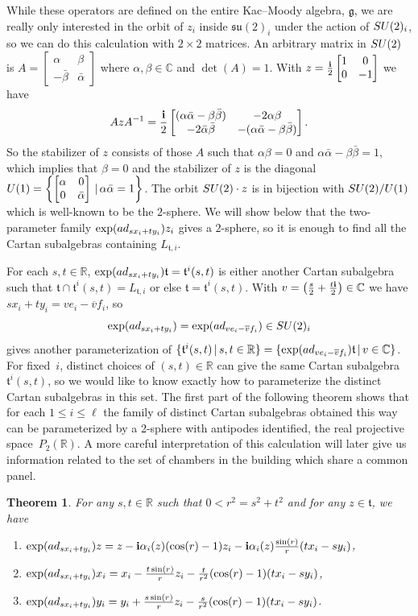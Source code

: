 \documentclass[11pt]{article}
\numberwithin{equation}{section}
\numberwithin{equation}{section}
\newtheorem{Theorem}{Theorem}[section]
\def\C{{\mathbb C}}
\def\R{\mathbb{R}}
\def\a{\alpha}
\def\bet{\beta}
\def\bm{\begin{bmatrix}}
\def\ebm{\end{bmatrix}}
\def\bi{{\bf i}}
\def\fg{\mathfrak{g}}
\def\ft{\mathfrak{t}}
\def\fsu{\mathfrak{su}}
\begin{document}
While these operators are defined on the entire Kac--Moody algebra, $\fg$, we are really only interested in the orbit of $z_i$ inside $\fsu(2)_i$ under the action of ${\rm SU}(2)_i$, so we can do this calculation with $2\times 2$ matrices. An arbitrary matrix in ${\rm SU}(2)$ is
$A = \bm \a&\bet\\ -\bar\bet&\bar\a\ebm$ where $\a,\bet\in\C$ and $\det(A) = 1$. With $z = \frac{\bi}{2} \bm 1&0\\0&-1\ebm$ we have
\[AzA^{-1} = \frac{\bi}{2} \bm (\a\bar\a-\bet\bar\bet)&-2\a\bet \\-2\bar\a\bar\bet&-(\a\bar\a-\bet\bar\bet)\ebm.\]
So the stabilizer of $z$ consists of those $A$ such that $\a\bet = 0$ and $\a\bar\a-\bet\bar\bet = 1$, which implies that $\bet = 0$ and
the stabilizer of $z$ is the diagonal ${\rm U}(1) = \left\{\bm \a&0\\ 0&\bar\a\ebm \,|\, \a\bar\a = 1\right\}$. The orbit ${\rm SU}(2)\cdot z$ is in
bijection with ${\rm SU}(2)/{\rm U}(1)$ which is well-known to be the $2$-sphere. We will show below that the two-parameter family
$\exp({\rm ad}_{sx_i+ty_i})z_i$ gives a $2$-sphere, so it is enough to find all the Cartan subalgebras containing $L_{\ft,i}$.

For each $s,t\in\R$, $\exp({\rm ad}_{sx_i+ty_i})\ft = \ft^i(s,t)$ is either another Cartan subalgebra such that $\ft\cap\ft^i(s,t) = L_{\ft,i}$ or else
$\ft = \ft^i(s,t)$. With $v=\big(\frac{s}{2}+\frac{t\bi}{2}\big)\in\C$ we have $sx_i+ty_i = v e_i-\overline{v}f_i$, so
\[\exp({\rm ad}_{sx_i+ty_i}) = \exp({\rm ad}_{v e_i-\overline{v}f_i}) \in {\rm SU}(2)_i\]
gives another parameterization of $\{\ft^i(s,t)\, |\, s,t\in\R\} = \{ \exp({\rm ad}_{v e_i-\overline{v}f_i})\ft\, |\, v\in\C\}$. For fixed~$i$, distinct choices of $(s,t)\in\R$ can give the same Cartan subalgebra $\ft^i(s,t)$, so we would like to know exactly how to
parameterize the distinct Cartan subalgebras in this set. The first part of the following theorem shows that for each $1\leq i \leq \ell$ the family of distinct Cartan subalgebras obtained this way can be parameterized by a 2-sphere with antipodes identified, the real projective space~$P_2(\R)$. A more careful interpretation of this calculation will later give us information related to the set of chambers in the building which share a common panel.

\begin{Theorem} \label{theorem:expformulas} For any $s,t\in\R$ such that $0 < r^2 = s^2 + t^2$
and for any $z\in\ft$, we have
\begin{enumerate}\itemsep=0pt
\item[$1)$] $\exp({\rm ad}_{sx_i+ty_i}) z = z - {\bi}\alpha_i(z) (\cos(r)-1) z_i - {\bi}\alpha_i(z) \frac{\sin(r)}{r} (tx_i-sy_i)$,
\item[$2)$] $\exp({\rm ad}_{sx_i+ty_i}) x_i = x_i - \frac{t\sin(r)}{r} z_i - \frac{t}{r^2} (\cos(r) - 1) (tx_i-sy_i)$,
\item[$3)$] $\exp({\rm ad}_{sx_i+ty_i}) y_i = y_i + \frac{s\sin(r)}{r} z_i - \frac{s}{r^2} (\cos(r) - 1) (tx_i-sy_i)$.
\end{enumerate}
\end{Theorem}
\end{document}

